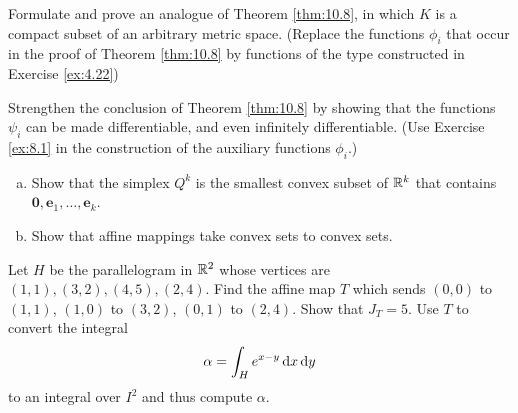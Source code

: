 \begin{myexercise}
    \label{ex:10.5}
    Formulate and prove an analogue of Theorem \ref{thm:10.8},
    in which $K$ is a compact subset of an arbitrary metric space.
    (Replace the functions $\phi_i$ that occur in the
    proof of Theorem \ref{thm:10.8}
    by functions of the type constructed in Exercise \ref{ex:4.22})
\end{myexercise}


\begin{myexercise}
    \label{ex:10.6}
    Strengthen the conclusion of Theorem \ref{thm:10.8} by showing that the functions $\psi_i$ can be made differentiable, and even infinitely differentiable.
    (Use Exercise \ref{ex:8.1} in the construction of the auxiliary functions $\phi_i$.)
\end{myexercise}


\begin{myexercise}
    \label{ex:10.7}
    \begin{enumerate}[(a)]
        \item Show that the simplex $Q^k$ is the smallest convex subset of ${\protect\mathbb R}^k$ that contains $\mathbf{0},\mathbf{e}_1,\dots,\mathbf{e}_k$.
        \item Show that affine mappings take convex sets to convex sets.
    \end{enumerate}
\end{myexercise}


\begin{myexercise}
    \label{ex:10.8}
    Let $H$ be the parallelogram in ${\protect\mathbb R}^2$ whose vertices are $(1, 1), (3, 2), (4, 5), (2, 4)$.
    Find the affine map $T$ which sends $(0, 0)$ to $(1, 1)$, $(1, 0)$ to $(3, 2)$, $(0, 1)$ to $(2, 4)$.
    Show that $J_T = 5$.
    Use $T$ to convert the integral
    \begin{equation*}
        \alpha = \int_H e^{x-y} \d x \d y
    \end{equation*}
    to an integral over $I^2$ and thus compute $\alpha$.
\end{myexercise}


